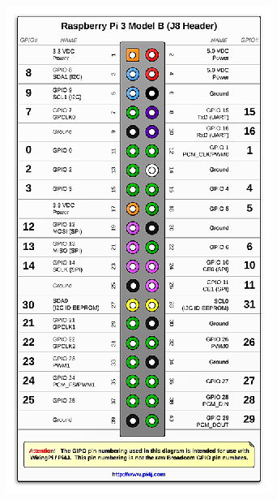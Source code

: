 \begin{figure}
\begin{center}
\includegraphics[width=\columnwidth]{./figs/gpio1}
\end{center}
\label{fig_1_3b}	
\end{figure}
\renewcommand{\thefigure}{\theproblem}

